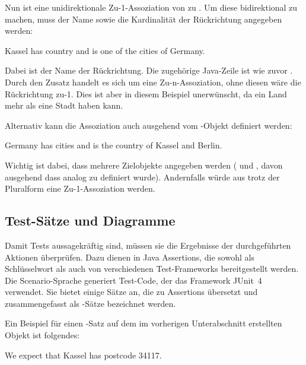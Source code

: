 Nun ist  eine unidirektionale Zu-1-Assoziation von  zu .
Um diese bidirektional zu machen, muss der Name sowie die Kardinalität der Rückrichtung angegeben werden:

\begin{codeblock}
    Kassel has country and is one of the cities of Germany.
\end{codeblock}

Dabei ist  der Name der Rückrichtung.
Die zugehörige Java-Zeile ist wie zuvor .
Durch den Zusatz  handelt es sich um eine Zu-n-Assoziation, ohne diesen wäre die Rückrichtung zu-1.
Dies ist aber in diesem Beispiel unerwünscht, da ein Land mehr als eine Stadt haben kann.

Alternativ kann die Assoziation auch ausgehend vom -Objekt definiert werden:

\begin{codeblock}
    Germany has cities and is the country of Kassel and Berlin.
\end{codeblock}

Wichtig ist dabei, dass mehrere Zielobjekte angegeben werden ( und , davon ausgehend dass  analog zu  definiert wurde).
Andernfalls würde aus  trotz der Pluralform eine Zu-1-Assoziation werden.

\subsection{Test-Sätze und Diagramme}\label{subsec:test-sentences-and-diagrams}

Damit Tests aussagekräftig sind, müssen sie die Ergebnisse der durchgeführten Aktionen überprüfen.
Dazu dienen in Java Assertions, die sowohl als Schlüsselwort als auch von verschiedenen Test-Frameworks bereitgestellt werden.
Die Scenario-Sprache generiert Test-Code, der das Framework JUnit~4~\cite{junit4} verwendet.
Sie bietet einige Sätze an, die zu Assertions übersetzt und zusammengefasst als -Sätze bezeichnet werden.

Ein Beispiel für einen -Satz auf dem im vorherigen Unterabschnitt erstellten Objekt  ist folgendes:

\begin{codeblock}
    We expect that Kassel has postcode 34117.
\end{codeblock}

